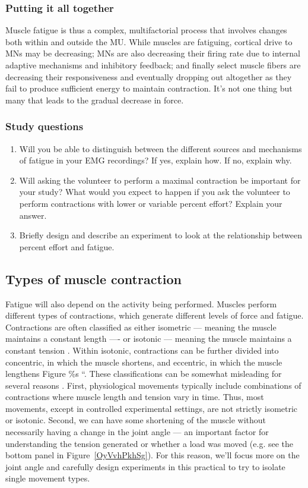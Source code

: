 \documentclass{article}
\begin{document}
\subsubsection{Putting it all together}

Muscle fatigue is thus a complex, multifactorial process that involves changes both within and outside the MU. While muscles are fatiguing, cortical drive to MNs may be decreasing; MNs are also decreasing their firing rate due to internal adaptive mechanisms and inhibitory feedback; and finally select muscle fibers are decreasing their responsiveness and eventually dropping out altogether as they fail to produce sufficient energy to maintain contraction. It's not one thing but many that leads to the gradual decrease in force.

\subsubsection{Study questions}

\begin{enumerate}
\item Will you be able to distinguish between the different sources and mechanisms of fatigue in your EMG recordings? If yes, explain how. If no, explain why.
\item Will asking the volunteer to perform a maximal contraction be important for your study? What would you expect to happen if you ask the volunteer to perform contractions with lower or variable percent effort? Explain your answer.
\item Briefly design and describe an experiment to look at the relationship between percent effort and fatigue.
\end{enumerate}

\subsection{Types of muscle contraction}

Fatigue will also depend on the activity being performed. Muscles perform different types of contractions, which generate different levels of force and fatigue. Contractions are often classified as either isometric --- meaning the muscle maintains a constant length ---- or isotonic --- meaning the muscle maintains a constant tension \citep{openStax_neuro}. Within isotonic, contractions can be further divided into concentric, in which the muscle shortens, and eccentric, in which the muscle lengthens \citep{}Figure \%s ``. These classifications can be somewhat misleading for several reasons \citep{faulkner2003terminology}. First, physiological movements typically include combinations of contractions where muscle length and tension vary in time. Thus, most movements, except in controlled experimental settings, are not strictly isometric or isotonic. Second, we can have some shortening of the muscle without necessarily having a change in the joint angle --- an important factor for understanding the tension generated or whether a load was moved (e.g. see the bottom panel in Figure~\ref{OyVvhPkhSg}). For this reason, we'll focus more on the joint angle and carefully design experiments in this practical to try to isolate single movement types.
\end{document}
